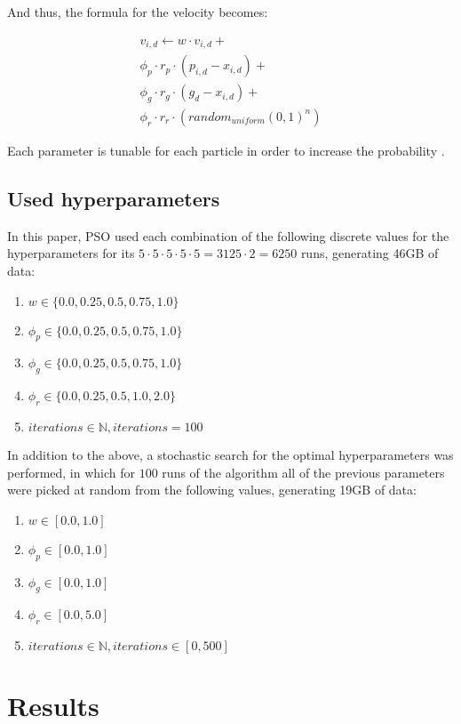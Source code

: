\documentclass[conference]{IEEEtran}
\begin{document}
And thus, the formula for the velocity becomes:

\begin{multline}
    v_{i,d} \leftarrow w \cdot v_{i,d}  + \\ \phi_p \cdot r_p \cdot (p_{i,d} - x_{i,d})  + \\ \phi_g \cdot r_g \cdot (g_d - x_{i,d}) + \\ \phi_r \cdot r_r \cdot (random_{uniform}(0, 1)^n)
\end{multline}

Each parameter is tunable for each particle in order to increase the probability .

\subsection{Used hyperparameters}
In this paper, PSO used each combination of the following discrete values for the hyperparameters for its $5 \cdot 5 \cdot 5 \cdot 5 \cdot 5 = 3125 \cdot 2 = 6250$
runs, generating 46GB of data:

\begin{enumerate}
    \item $w \in \{0.0, 0.25, 0.5, 0.75, 1.0\}$
    \item $\phi_p \in \{0.0, 0.25, 0.5, 0.75, 1.0\}$
    \item $\phi_g \in \{0.0, 0.25, 0.5, 0.75, 1.0\}$
    \item $\phi_r \in \{0.0, 0.25, 0.5, 1.0, 2.0\}$
    \item $iterations \in \mathbb{N}, iterations = 100$
\end{enumerate}

In addition to the above, a stochastic search for the optimal hyperparameters was performed, in which for $100$ runs of the algorithm
all of the previous parameters were picked at random from the following values, generating 19GB of data:

\begin{enumerate}
    \item $w \in [0.0, 1.0]$
    \item $\phi_p \in [0.0, 1.0]$
    \item $\phi_g \in [0.0, 1.0]$
    \item $\phi_r \in [0.0, 5.0]$
    \item $iterations \in \mathbb{N}, iterations \in [0, 500]$
\end{enumerate}

\section{Results}
\end{document}

